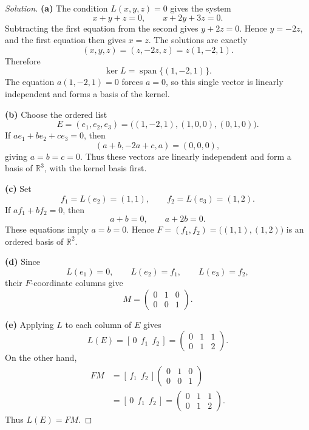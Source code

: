 \begin{proof}[Solution]
  \textbf{(a)} The condition \(L(x,y,z)=0\) gives the system
    \[
      x+y+z=0,
      \qquad
      x+2y+3z=0.
    \]
    Subtracting the first equation from the second gives \(y+2z=0\).
    Hence \(y=-2z\), and the first equation then gives \(x=z\).
    The solutions are exactly
    \[
      (x,y,z)=(z,-2z,z)=z(1,-2,1).
    \]
    Therefore
    \[
      \ker L=\operatorname{span}\{(1,-2,1)\}.
    \]
    The equation \(a(1,-2,1)=0\) forces \(a=0\), so this single
    vector is linearly independent and forms a basis of the kernel.

  \textbf{(b)} Choose the ordered list
    \[
      E=(e_1,e_2,e_3)
        =\bigl((1,-2,1),(1,0,0),(0,1,0)\bigr).
    \]
    If \(ae_1+be_2+ce_3=0\), then
    \[
      (a+b,-2a+c,a)=(0,0,0),
    \]
    giving \(a=b=c=0\). Thus these vectors are linearly independent
    and form a basis of \(\mathbb{R}^3\), with the kernel basis first.

  \textbf{(c)} Set
    \[
      f_1=L(e_2)=(1,1),
      \qquad
      f_2=L(e_3)=(1,2).
    \]
    If \(af_1+bf_2=0\), then
    \[
      a+b=0,
      \qquad
      a+2b=0.
    \]
    These equations imply \(a=b=0\). Hence
    \(F=(f_1,f_2)=\bigl((1,1),(1,2)\bigr)\) is an ordered basis
    of \(\mathbb{R}^2\).

  \textbf{(d)} Since
    \[
      L(e_1)=0,
      \qquad
      L(e_2)=f_1,
      \qquad
      L(e_3)=f_2,
    \]
    their \(F\)-coordinate columns give
    \[
      M=\begin{pmatrix}0&1&0\\0&0&1\end{pmatrix}.
    \]

  \textbf{(e)} Applying \(L\) to each column of \(E\) gives
    \[
      L(E)=[\,0\ \ f_1\ \ f_2\,]
        =\begin{pmatrix}0&1&1\\0&1&2\end{pmatrix}.
    \]
    On the other hand,
    \begin{align*}
      FM
        &=[\,f_1\ \ f_2\,]
          \begin{pmatrix}0&1&0\\0&0&1\end{pmatrix}\\
        &=[\,0\ \ f_1\ \ f_2\,]
          =\begin{pmatrix}0&1&1\\0&1&2\end{pmatrix}.
    \end{align*}
    Thus \(L(E)=FM\).
\end{proof}
